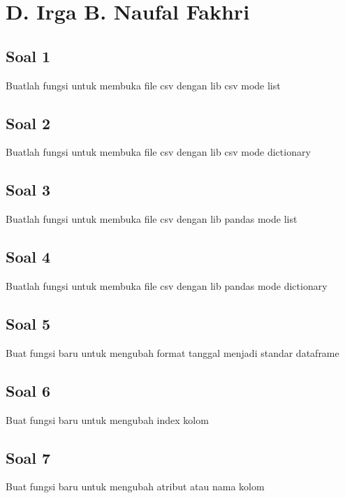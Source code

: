 \section{D. Irga B. Naufal Fakhri}
\subsection{Soal 1}
Buatlah fungsi untuk membuka file csv dengan lib csv mode list


\subsection{Soal 2}
Buatlah fungsi untuk membuka file csv dengan lib csv mode dictionary


\subsection{Soal 3}
Buatlah fungsi untuk membuka file csv dengan lib pandas mode list


\subsection{Soal 4}
Buatlah fungsi untuk membuka file csv dengan lib pandas mode dictionary


\subsection{Soal 5}
Buat fungsi baru untuk mengubah format tanggal menjadi standar dataframe


\subsection{Soal 6}
Buat fungsi baru  untuk mengubah index kolom


\subsection{Soal 7}
Buat fungsi baru untuk mengubah atribut atau nama kolom


